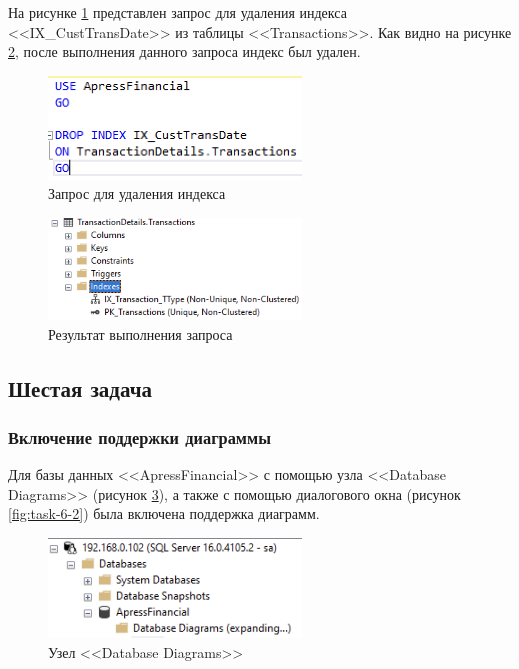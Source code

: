 \documentclass[a4paper, 14pt]{extarticle}
\begin{document}
На рисунке \ref{fig:task-5-1} представлен запрос для удаления индекса
<<\foreignlanguage{english}{IX\_CustTransDate}>> из таблицы
<<\foreignlanguage{english}{Transactions}>>. Как видно на рисунке
\ref{fig:task-5-2}, после выполнения данного запроса индекс был удален.

\begin{figure}[H]
  \centering
  \includegraphics[width=0.6\textwidth]{images/task-5/1.png}
  \caption{Запрос для удаления индекса}
  \label{fig:task-5-1}
\end{figure}

\begin{figure}[H]
  \centering
  \includegraphics[width=0.6\textwidth]{images/task-5/2.png}
  \caption{Результат выполнения запроса}
  \label{fig:task-5-2}
\end{figure}

\subsection{Шестая задача}

\subsubsection{Включение поддержки диаграммы}

Для базы данных <<\foreignlanguage{english}{ApressFinancial}>> с помощью узла
<<\foreignlanguage{english}{Database Diagrams}>> (рисунок \ref{fig:task-6-1}), а
также с помощью диалогового окна (рисунок \ref{fig:task-6-2}) была включена
поддержка диаграмм.

\begin{figure}[H]
  \centering
  \includegraphics[width=0.6\textwidth]{images/task-6/1.png}
  \caption{Узел <<Database Diagrams>>}
  \label{fig:task-6-1}
\end{figure}
\end{document}
